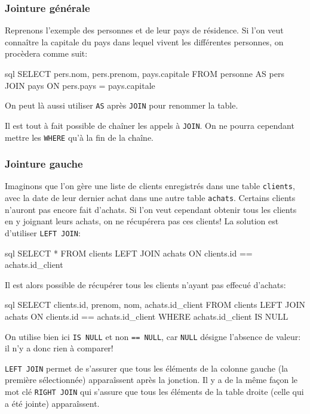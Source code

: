 \documentclass[a4paper]{scrartcl}
\begin{document}
			\subsubsection{Jointure générale}
				\semidef Reprenons l'exemple des personnes et de leur pays de résidence.
				Si l'on veut connaître la capitale du pays dans lequel vivent les différentes personnes, on procèdera comme suit:
				\begin{code}{sql}
					SELECT pers.nom, pers.prenom, pays.capitale
					FROM personne AS pers
					JOIN pays
					ON pers.pays = pays.capitale
				\end{code}

				\rem On peut là aussi utiliser \texttt{AS} après \texttt{JOIN} pour renommer la table.

				\rem Il est tout à fait possible de chaîner les appels à \texttt{JOIN}. On ne pourra cependant mettre les \texttt{WHERE} qu'à la fin de la chaîne.

			\subsubsection{Jointure gauche}
				\semidef Imaginons que l'on gère une liste de clients enregistrés dans une table \texttt{clients}, 
				avec la date de leur dernier achat dans une autre table \texttt{achats}.
				Certains clients n'auront pas encore fait d'achats. 
				Si l'on veut cependant obtenir tous les clients en y joignant leurs achats, on ne récupérera pas ces clients!
				La solution est d'utiliser \texttt{LEFT JOIN}:
				\begin{code}{sql}
					SELECT *
					FROM clients
					LEFT JOIN achats ON clients.id == achats.id_client
				\end{code}

				Il est alors possible de récupérer tous les clients n'ayant pas effecué d'achats:
				\begin{code}{sql}
					SELECT clients.id, prenom, nom, achats.id_client
					FROM clients
					LEFT JOIN achats ON clients.id == achats.id_client
					WHERE achats.id_client IS NULL
				\end{code}

				\rem On utilise bien ici \texttt{IS NULL} et non \texttt{== NULL}, car \texttt{NULL} désigne l'absence de valeur: il n'y a donc rien à comparer!

				\rem \texttt{LEFT JOIN} permet de s'assurer que tous les éléments de la colonne gauche (la première sélectionnée) 
				apparaîssent après la jonction. Il y a de la même façon le mot clé \texttt{RIGHT JOIN} qui s'assure que
				tous les éléments de la table droite (celle qui a été jointe) apparaîssent.
\end{document}
